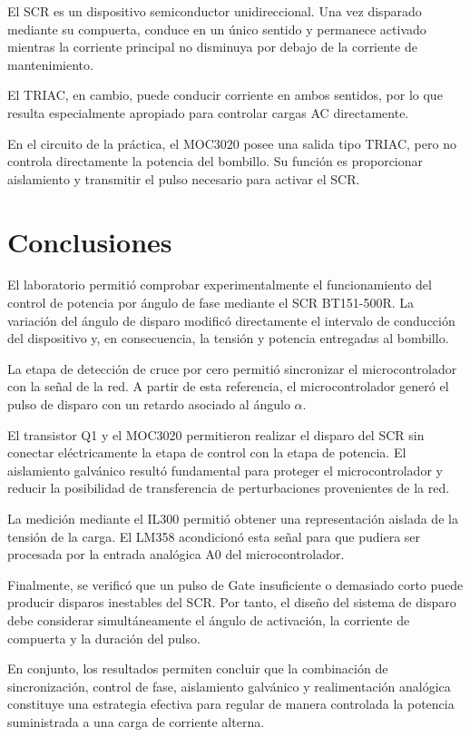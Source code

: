 \documentclass[12pt]{article}
\begin{document}
El SCR es un dispositivo semiconductor unidireccional. Una vez disparado mediante su compuerta, conduce en un único sentido y permanece activado mientras la corriente principal no disminuya por debajo de la corriente de mantenimiento.

El TRIAC, en cambio, puede conducir corriente en ambos sentidos, por lo que resulta especialmente apropiado para controlar cargas AC directamente.

En el circuito de la práctica, el MOC3020 posee una salida tipo TRIAC, pero no controla directamente la potencia del bombillo. Su función es proporcionar aislamiento y transmitir el pulso necesario para activar el SCR.


\section{Conclusiones}

El laboratorio permitió comprobar experimentalmente el funcionamiento del control de potencia por ángulo de fase mediante el SCR BT151-500R. La variación del ángulo de disparo modificó directamente el intervalo de conducción del dispositivo y, en consecuencia, la tensión y potencia entregadas al bombillo.

La etapa de detección de cruce por cero permitió sincronizar el microcontrolador con la señal de la red. A partir de esta referencia, el microcontrolador generó el pulso de disparo con un retardo asociado al ángulo $\alpha$.

El transistor Q1 y el MOC3020 permitieron realizar el disparo del SCR sin conectar eléctricamente la etapa de control con la etapa de potencia. El aislamiento galvánico resultó fundamental para proteger el microcontrolador y reducir la posibilidad de transferencia de perturbaciones provenientes de la red.

La medición mediante el IL300 permitió obtener una representación aislada de la tensión de la carga. El LM358 acondicionó esta señal para que pudiera ser procesada por la entrada analógica A0 del microcontrolador.

Finalmente, se verificó que un pulso de Gate insuficiente o demasiado corto puede producir disparos inestables del SCR. Por tanto, el diseño del sistema de disparo debe considerar simultáneamente el ángulo de activación, la corriente de compuerta y la duración del pulso.

En conjunto, los resultados permiten concluir que la combinación de sincronización, control de fase, aislamiento galvánico y realimentación analógica constituye una estrategia efectiva para regular de manera controlada la potencia suministrada a una carga de corriente alterna.
\end{document}
